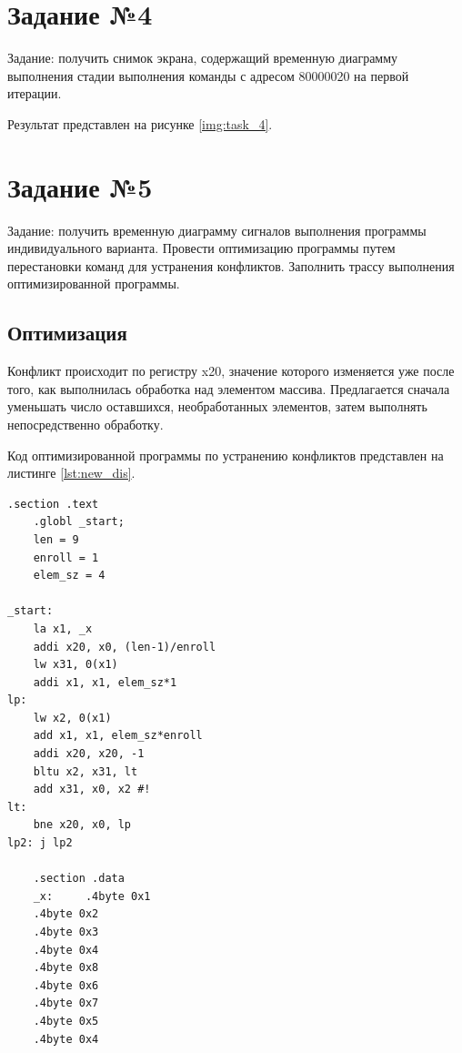 \section{\textbf{Задание №4}}

Задание: получить снимок экрана, содержащий временную диаграмму выполнения стадии выполнения команды с адресом 80000020 на первой итерации.

Результат представлен на рисунке \ref{img:task_4}.
\begin{figure}[H]
	\captionsetup{justification=centering}
\end{figure}

\section{\textbf{Задание №5}}
Задание: получить временную диаграмму сигналов выполнения программы индивидуального варианта. Провести оптимизацию программы путем перестановки команд для устранения конфликтов. Заполнить трассу выполнения оптимизированной программы.

\subsection{\textbf{Оптимизация}}
Конфликт происходит по регистру x20, значение которого изменяется уже после того, как выполнилась обработка над элементом массива. Предлагается сначала уменьшать число оставшихся, необработанных элементов, затем выполнять непосредственно обработку.

Код оптимизированной программы по устранению конфликтов представлен на листинге \ref{lst:new_dis}.
\begin{lstlisting}[label=lst:new_dis,caption=Исходный текст исследуемой программы]
    .section .text
	.globl _start;
	len = 9
	enroll = 1
	elem_sz = 4

_start:
	la x1, _x
	addi x20, x0, (len-1)/enroll
	lw x31, 0(x1)
	addi x1, x1, elem_sz*1
lp:
	lw x2, 0(x1)
	add x1, x1, elem_sz*enroll
	addi x20, x20, -1
	bltu x2, x31, lt
	add x31, x0, x2 #!
lt:
	bne x20, x0, lp
lp2: j lp2

	.section .data
	_x:     .4byte 0x1
	.4byte 0x2
	.4byte 0x3
	.4byte 0x4
	.4byte 0x8
	.4byte 0x6
	.4byte 0x7
	.4byte 0x5
	.4byte 0x4
\end{lstlisting}

